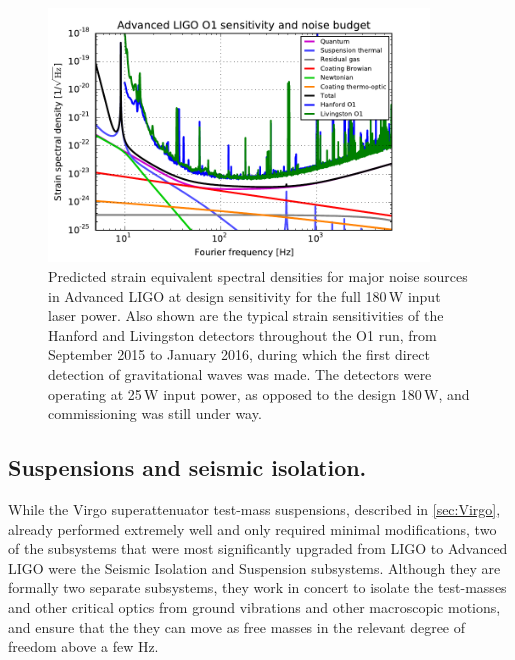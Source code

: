 \begin{figure}[htb]
	\begin{center}
		\includegraphics[width=0.9\textwidth]{Figures/aLIGOnbudget.pdf}
		\caption{\label{fig:aLIGOnbudget}Predicted strain equivalent spectral densities for major noise sources in Advanced LIGO at design sensitivity for the full 180\,W input laser power. Also shown are the typical strain sensitivities of the Hanford and Livingston detectors throughout the O1 run, from September 2015 to January 2016, during which the first direct detection of gravitational waves was made. The detectors were operating at 25\,W input power, as opposed to the design 180\,W, and commissioning was still under way.}
	\end{center}
\end{figure}

\subsection{Suspensions and seismic isolation.}
While the Virgo superattenuator test-mass suspensions, described in \autoref{sec:Virgo}, already performed extremely well and only required minimal modifications, two of the subsystems that were most significantly upgraded from LIGO to Advanced LIGO were the Seismic Isolation\cite{SEI2015} and Suspension subsystems.
Although they are formally two separate subsystems, they work in concert to isolate the test-masses and  other critical optics from ground vibrations and other macroscopic motions, and ensure that the they can move as free masses in the relevant degree of freedom above a few Hz.

